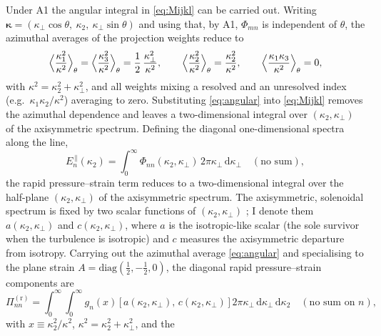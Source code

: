 \documentclass[lineno]{JFM-FLM_Au}
\begin{document}
Under A1 the angular integral in \eqref{eq:Mijkl} can be carried out. Writing
$\boldsymbol{\kappa}=(\kappa_\perp\cos\theta,\ \kappa_2,\
\kappa_\perp\sin\theta)$ and using that, by A1, $\Phi_{mn}$ is independent of
$\theta$, the azimuthal averages of the projection weights reduce to
\begin{equation}
  \Bigl\langle \frac{\kappa_1^2}{\kappa^2}\Bigr\rangle_\theta
  = \Bigl\langle \frac{\kappa_3^2}{\kappa^2}\Bigr\rangle_\theta
  = \frac{1}{2}\,\frac{\kappa_\perp^2}{\kappa^2},
  \qquad
  \Bigl\langle \frac{\kappa_2^2}{\kappa^2}\Bigr\rangle_\theta
  = \frac{\kappa_2^2}{\kappa^2},
  \qquad
  \Bigl\langle \frac{\kappa_1\kappa_3}{\kappa^2}\Bigr\rangle_\theta = 0,
  \label{eq:angular}
\end{equation}
with $\kappa^2=\kappa_2^2+\kappa_\perp^2$, and all weights mixing a resolved
and an unresolved index (e.g.\ $\kappa_1\kappa_2/\kappa^2$) averaging to zero.
Substituting \eqref{eq:angular} into \eqref{eq:Mijkl} removes the azimuthal
dependence and leaves a two-dimensional integral over $(\kappa_2,\kappa_\perp)$
of the axisymmetric spectrum. Defining the diagonal one-dimensional spectra
along the line,
\begin{equation}
  E_n^{\,\|}(\kappa_2)
   = \int_0^\infty \Phi_{nn}(\kappa_2,\kappa_\perp)\,
     2\pi\kappa_\perp\,\mathrm{d}\kappa_\perp
   \quad(\text{no sum}),
   \label{eq:Epar}
\end{equation}
the rapid pressure--strain term reduces to a two-dimensional integral over the
half-plane $(\kappa_2,\kappa_\perp)$ of the axisymmetric spectrum. The
axisymmetric, solenoidal spectrum is fixed by two scalar functions of
$(\kappa_2,\kappa_\perp)$ \citep{Batchelor1946,ChandrasekharAxisym1950}; I
denote them $a(\kappa_2,\kappa_\perp)$ and $c(\kappa_2,\kappa_\perp)$, where
$a$ is the isotropic-like scalar (the sole survivor when the turbulence is
isotropic) and $c$ measures the axisymmetric departure from isotropy. Carrying
out the azimuthal average \eqref{eq:angular} and specialising to the plane
strain $A=\mathrm{diag}(\tfrac12,-\tfrac12,0)$, the diagonal rapid
pressure--strain components are
\begin{equation}
  \Pi^{(\mathrm r)}_{nn}
  = \int_{0}^{\infty}\!\!\int_{0}^{\infty}
      g_{n}(x)\,\bigl[\,a(\kappa_2,\kappa_\perp),\,c(\kappa_2,\kappa_\perp)\,\bigr]\,
      2\pi\kappa_\perp\,\mathrm{d}\kappa_\perp\,\mathrm{d}\kappa_2
   \quad(\text{no sum on }n),
  \label{eq:Piclosed}
\end{equation}
with $x\equiv\kappa_2^2/\kappa^2$, $\kappa^2=\kappa_2^2+\kappa_\perp^2$, and the
\end{document}
